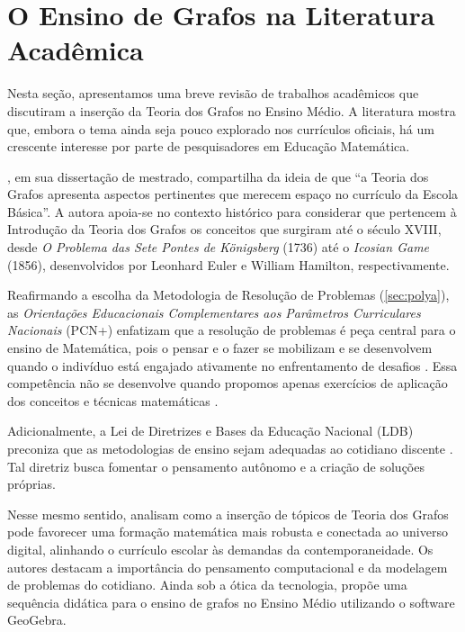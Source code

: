 \documentclass[
  12pt,
  oneside,
  a4paper,
  english,
  brazilian
  ]{abntex2}
\theoremstyle{definition}
\begin{document}
\section{O Ensino de Grafos na Literatura Acadêmica}

Nesta seção, apresentamos uma breve revisão de trabalhos acadêmicos que discutiram a inserção da Teoria dos Grafos no Ensino Médio. A literatura mostra que, embora o tema ainda seja pouco explorado nos currículos oficiais, há um crescente interesse por parte de pesquisadores em Educação Matemática.

\textcite{malta2008}, em sua dissertação de mestrado, compartilha da ideia de que ``a Teoria dos Grafos apresenta aspectos pertinentes que merecem espaço no currículo da Escola Básica''. A autora apoia-se no contexto histórico para considerar que pertencem à Introdução da Teoria dos Grafos os conceitos que surgiram até o século XVIII, desde \textit{O Problema das Sete Pontes de Königsberg} (1736) até o \textit{Icosian Game} (1856), desenvolvidos por Leonhard Euler e William Hamilton, respectivamente.

Reafirmando a escolha da Metodologia de Resolução de Problemas (\ref{sec:polya}), as \textit{Orientações Educacionais Complementares aos Parâmetros Curriculares Nacionais} (PCN+) enfatizam que a resolução de problemas é peça central para o ensino de Matemática, pois o pensar e o fazer se mobilizam e se desenvolvem quando o indivíduo está engajado ativamente no enfrentamento de desafios \cite{brasil2002}. Essa competência não se desenvolve quando propomos apenas exercícios de aplicação dos conceitos e técnicas matemáticas \cite{brasil2002}.

Adicionalmente, a Lei de Diretrizes e Bases da Educação Nacional (LDB) preconiza que as metodologias de ensino sejam adequadas ao cotidiano discente \cite{brasil1996}. Tal diretriz busca fomentar o pensamento autônomo e a criação de soluções próprias.

Nesse mesmo sentido, \textcite{rodrigues2021} analisam como a inserção de tópicos de Teoria dos Grafos pode favorecer uma formação matemática mais robusta e conectada ao universo digital, alinhando o currículo escolar às demandas da contemporaneidade. Os autores destacam a importância do pensamento computacional e da modelagem de problemas do cotidiano. Ainda sob a ótica da tecnologia, \textcite{silva2020} propõe uma sequência didática para o ensino de grafos no Ensino Médio utilizando o software GeoGebra.
\end{document}

